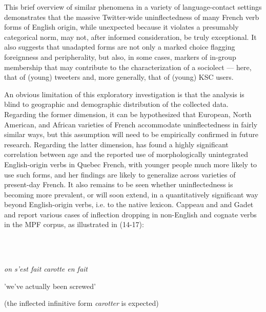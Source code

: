 \documentclass[output=paper]{langscibook}
\begin{document}
This brief overview of similar phenomena in a variety of language-contact settings demonstrates that the massive Twitter-wide uninflectedness of many French verb forms of English origin, while unexpected because it violates a presumably categorical norm, may not, after informed consideration, be truly exceptional. It also suggests that unadapted forms are not only a marked choice flagging foreignness and peripherality, but also, in some cases, markers of in-group membership that may contribute to the characterization of a sociolect — here, that of (young) tweeters and, more generally, that of (young) KSC users.

An obvious limitation of this exploratory investigation is that the analysis is blind to geographic and demographic distribution of the collected data. Regarding the former dimension, it can be hypothesized that European, North American, and African varieties of French accommodate uninflectedness in fairly similar ways, but this assumption will need to be empirically confirmed in future research. Regarding the latter dimension, \citet{Bouchard2023} has found a highly significant correlation between age and the reported use of morphologically unintegrated English-origin verbs in Quebec French, with younger people much more likely to use such forms, and her findings are likely to generalize across varieties of present-day French. It also remains to be seen whether uninflectedness is becoming more prevalent, or will soon extend, in a quantitatively significant way beyond English-origin verbs, i.e. to the native lexicon. Cappeau and \citet[79]{Moreno2017} and Gadet and \citet[737]{Hamblye2018} report various cases of inflection dropping in non-English and cognate verbs in the MPF corpus, as illustrated in (14-17):

\ea%
    \label{ex:key:14}
    \gll \\
         \\
    \glt
    \z %

          \textit{on s'est fait carotte en fait}

  {}'we've actually been screwed'

  (the inflected infinitive form \textit{carotter} is expected)

\ea%
    \label{ex:key:15}
    \gll \\
         \\
    \glt
    \z %
\end{document}
